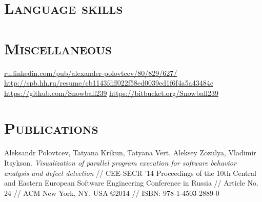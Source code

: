\documentclass[12pt,a4paper]{moderncv}
\begin{document}

\section{\textsc{Language skills}}
%


\section{\textsc{Miscellaneous}}
%
       {{\color{see}\url{ru.linkedin.com/pub/alexander-polovtcev/80/829/627/}}}
       {{\color{see}\url{http://spb.hh.ru/resume/cb1143fdff022f58ed0039ed1f6f4a5a43484c}}}
       {{\color{see}\url{https://github.com/Snowball239}}}
       {{\color{see}\url{https://bitbucket.org/Snowball239}}}


\section{\textsc{Publications}}
%
    {Aleksandr Polovtcev, Tatyana Krikun, Tatyana Vert, Aleksey Zozulya, Vladimir Itsykson.
    \textit{Visualization of parallel program execution for software behavior analysis and defect detection}
    // CEE-SECR '14 Proceedings of the 10th Central and Eastern European Software Engineering Conference in Russia
    // Article No. 24
    // ACM New York, NY, USA ©2014
    // ISBN: 978-1-4503-2889-0
}
\end{document}
